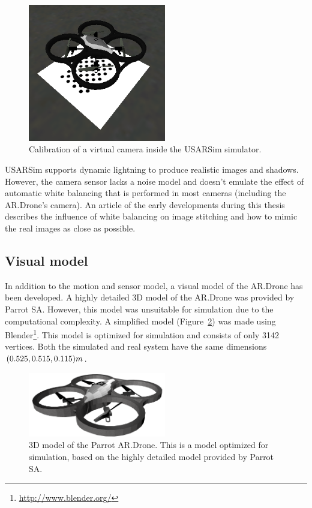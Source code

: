 \begin{figure}[htb!]
\centering
\includegraphics[width=6cm]{images/usarsim_camera_calibration.png}
\caption{Calibration of a virtual camera inside the USARSim simulator.} 
\label{fig:3Dmodel}
\end{figure}

USARSim supports dynamic lightning to produce realistic images and shadows.
However, the camera sensor lacks a noise model and doesn't emulate the effect of automatic white balancing that is performed in most cameras (including the AR.Drone's camera).
An article of the early developments during this thesis \cite{Visser2011imav} describes the influence of white balancing on image stitching and how to mimic the real images as close as possible.


		\subsection{Visual model}
In addition to the motion and sensor model, a visual model of the AR.Drone has been developed.
A highly detailed 3D model of the AR.Drone was provided by Parrot SA.
However, this model was unsuitable for simulation due to the computational complexity.
A simplified model (Figure~\ref{fig:3Dmodel}) was made using Blender\footnote{\url{http://www.blender.org/}}.
This model is optimized for simulation and consists of only 3142 vertices.
Both the simulated and real system have the same dimensions $(0.525,0.515,0.115)\small{m}$.

\begin{figure}[htb!]
\centering
\includegraphics[width=6cm]{images/ardrone_blender_final.png}
\caption{3D model of the Parrot AR.Drone. This is a model optimized for simulation, based on the highly detailed model provided by Parrot SA.} 
\label{fig:3Dmodel}
\end{figure}


